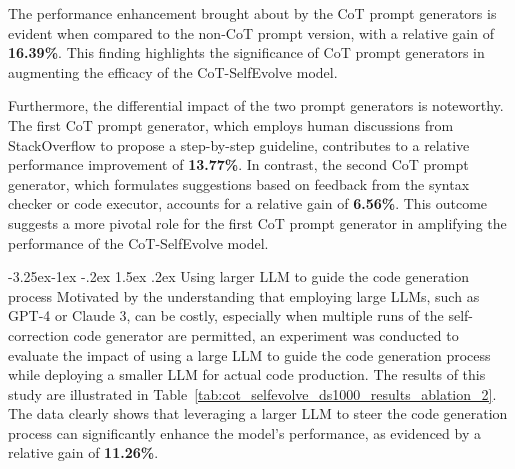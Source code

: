 \documentclass[a4paper,oneside]{book}
\makeatletter
\newcounter {subsubsubsection}[subsubsection]
\newcommand\subsubsubsection{\@startsection{subsubsubsection}{4}{\z@}%
                                    {-3.25ex\@plus -1ex \@minus -.2ex}%
                                    {1.5ex \@plus .2ex}%
                                    {\normalfont\normalsize\bfseries}}
\makeatother
\begin{document}
The performance enhancement brought about by the CoT prompt generators is evident when compared to the non-CoT prompt version, with a relative gain of \textbf{16.39\%}. This finding highlights the significance of CoT prompt generators in augmenting the efficacy of the CoT-SelfEvolve model.

Furthermore, the differential impact of the two prompt generators is noteworthy. The first CoT prompt generator, which employs human discussions from StackOverflow to propose a step-by-step guideline, contributes to a relative performance improvement of \textbf{13.77\%}. In contrast, the second CoT prompt generator, which formulates suggestions based on feedback from the syntax checker or code executor, accounts for a relative gain of \textbf{6.56\%}. This outcome suggests a more pivotal role for the first CoT prompt generator in amplifying the performance of the CoT-SelfEvolve model.

\subsubsubsection{Using larger LLM to guide the code generation process}
Motivated by the understanding that employing large LLMs, such as GPT-4 or Claude 3, can be costly, especially when multiple runs of the self-correction code generator are permitted, an experiment was conducted to evaluate the impact of using a large LLM to guide the code generation process while deploying a smaller LLM for actual code production. The results of this study are illustrated in Table~\ref{tab:cot_selfevolve_ds1000_results_ablation_2}. The data clearly shows that leveraging a larger LLM to steer the code generation process can significantly enhance the model's performance, as evidenced by a relative gain of \textbf{11.26\%}.

\begin{table}[H]
  \caption{$\text{Pass@5}$ results on the DS-1000 dataset with different LLM stacks. (\%)}\label{tab:cot_selfevolve_ds1000_results_ablation_2}
  \centering
\end{table}
\end{document}
